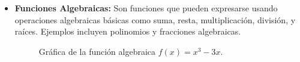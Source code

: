 \begin{itemize}
    \item \textbf{Funciones Algebraicas:} Son funciones que pueden expresarse usando operaciones algebraicas básicas como suma, resta, multiplicación, división, y raíces. Ejemplos incluyen polinomios y fracciones algebraicas.
    \begin{figure}[h!]
        \centering
        \caption{Gráfica de la función algebraica $f(x) = x^3 - 3x$.}
        \end{figure}
    


\end{itemize}
